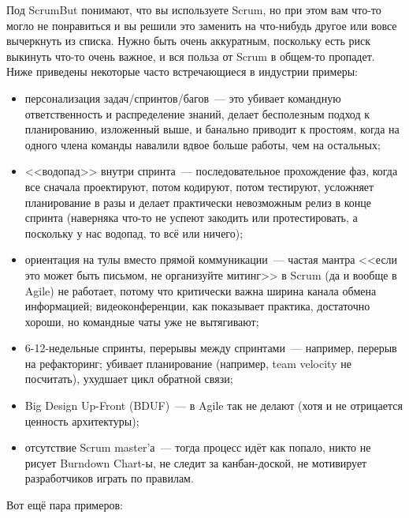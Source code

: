 \documentclass{../../text-style}
\begin{document}
Под ScrumBut понимают, что вы используете Scrum, но при этом вам что-то могло не понравиться и вы решили это заменить на что-нибудь другое или вовсе вычеркнуть из списка. Нужно быть очень аккуратным, поскольку есть риск выкинуть что-то очень важное, и вся польза от Scrum в общем-то пропадет. Ниже приведены некоторые часто встречающиеся в индустрии примеры:

\begin{itemize}
    \item персонализация задач/спринтов/багов~--- это убивает командную ответственность и распределение знаний, делает бесполезным подход к планированию, изложенный выше, и банально приводит к простоям, когда на одного члена команды навалили вдвое больше работы, чем на остальных;
    \item <<водопад>> внутри спринта~--- последовательное прохождение фаз, когда все сначала проектируют, потом кодируют, потом тестируют, усложняет планирование в разы и делает практически невозможным релиз в конце спринта (наверняка что-то не успеют закодить или протестировать, а поскольку у нас водопад, то всё или ничего);
    \item ориентация на тулы вместо прямой коммуникации~--- частая мантра <<если это может быть письмом, не организуйте митинг>> в Scrum (да и вообще в Agile) не работает, потому что критически важна ширина канала обмена информацией; видеоконференции, как показывает практика, достаточно хороши, но командные чаты уже не вытягивают;
    \item 6-12-недельные спринты, перерывы между спринтами~--- например, перерыв на рефакторинг; убивает планирование (например, team velocity не посчитать), ухудшает цикл обратной связи;
    \item Big Design Up-Front (BDUF)~--- в Agile так не делают (хотя и не отрицается ценность архитектуры);
    \item отсутствие Scrum master’а~--- тогда процесс идёт как попало, никто не рисует Burndown Chart-ы, не следит за канбан-доской, не мотивирует разработчиков играть по правилам.
\end{itemize}

Вот ещё пара примеров:
\end{document}
